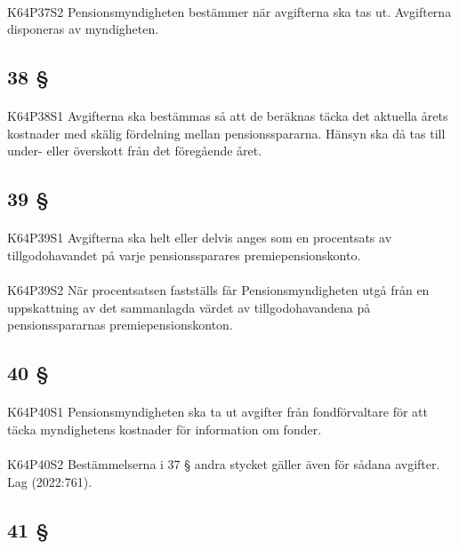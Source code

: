 \documentclass[a4paper,notitlepage,openany,10pt]{book}
\begin{document}
\paragraph*{}
{\tiny K64P37S2}
Pensionsmyndigheten bestämmer när avgifterna ska tas ut.
Avgifterna disponeras av myndigheten.
\subsection*{38 §}
\paragraph*{}
{\tiny K64P38S1}
Avgifterna ska bestämmas så att de beräknas täcka det aktuella årets kostnader med skälig fördelning mellan pensionsspararna. Hänsyn ska då tas till under- eller överskott från det föregående året.
\subsection*{39 §}
\paragraph*{}
{\tiny K64P39S1}
Avgifterna ska helt eller delvis anges som en procentsats av tillgodohavandet på varje pensionssparares premiepensionskonto.
\paragraph*{}
{\tiny K64P39S2}
När procentsatsen fastställs får Pensionsmyndigheten utgå från en uppskattning av det sammanlagda värdet av tillgodohavandena på pensionsspararnas premiepensionskonton.
\subsection*{40 §}
\paragraph*{}
{\tiny K64P40S1}
Pensionsmyndigheten ska ta ut avgifter från fondförvaltare för att täcka myndighetens kostnader för information om fonder.
\paragraph*{}
{\tiny K64P40S2}
Bestämmelserna i 37 § andra stycket gäller även för sådana avgifter.
Lag (2022:761).
\subsection*{41 §}
\end{document}
